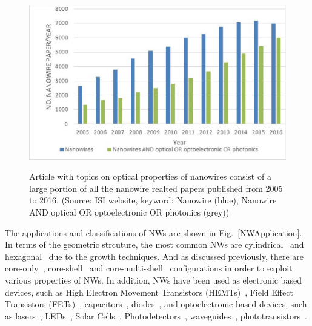 \begin{figure}
  \caption{Article with topics on optical properties of nanowires consist of a large portion of all the nanowire realted papers published from 2005 to 2016. (Source: ISI website, keyword: Nanowire (blue), Nanowire AND optical OR optoelectronic OR photonics (grey))}
  \centering
  \includegraphics[width=\textwidth]{pictures/Introduction/ISIPublication}
  \label{ISIPublication}
\end{figure}

The applications and classifications of NWs are shown in
Fig.~\ref{NWApplication}. In terms of the geometric strcuture, the most common
NWs are cylindrical~\cite{Cao:2010dc,Cao:2009ho} and
hexagonal~\cite{Royo:2015vw,Currie:2013to} due to the growth techniques. And as
discussed previously, there are
core-only~\cite{Heo:2004fp,he2007piezoelectric,Duan:2003en},
core-shell~\cite{Moratis:2016ws,Wang:2015bz} and
core-multi-shell~\cite{Badada:2015jq,Takehiro:2016tl} configurations in order
to exploit various properties of NWs. In addition, NWs have been used as
electronic based devices, such as High Electron Movement Transistors
(HEMTs)~\cite{li2006dopant,sakaki1980scattering}, Field Effect Transistors
(FETs)~\cite{xiang2006ge,singh2006high,suk2005high},
capacitors~\cite{Liu:2012cz}, diodes~\cite{Wallentin:2010kf,heo2004pt},
and optoelectronic based devices, such as
lasers~\cite{Li:2015ir,Wei:2014hr,Saxena:2013fe,Mayer:2013jh,Chen:2011cg,Hua:2009kf,Agarwal:2005is,Gradecak:2005eb,Duan:2003en},
LEDs~\cite{Zhao:2015hl,Nami:2015df,Chuang:2011jk,Bavencove:2011io,Kim:2004je},
Solar Cells~\cite{Wang:2015dp,Yu:2014hj,Wang:2012dh,Kelzenberg:2010fa,Garnett:2008jk,Tsakalakos:2007kz,Tian:2007kl},
Photodetectors~\cite{Chen:2015dz,deLunaBugallo:2010ci,Cao:2010dc,Pettersson:2006ft,Kind:2002fk,Liang:2001ka},
waveguides~\cite{Grego:2011ka,Oulton:2008fi,Yamada:2005bl,Sirbuly:2005ir,Chandrasekhar:1987kk},
phototransistors~\cite{Zhang:2010fq,Seo:2010cf,Persano:2010if,Park:2008cn,Logeeswaran:2008fw}.


